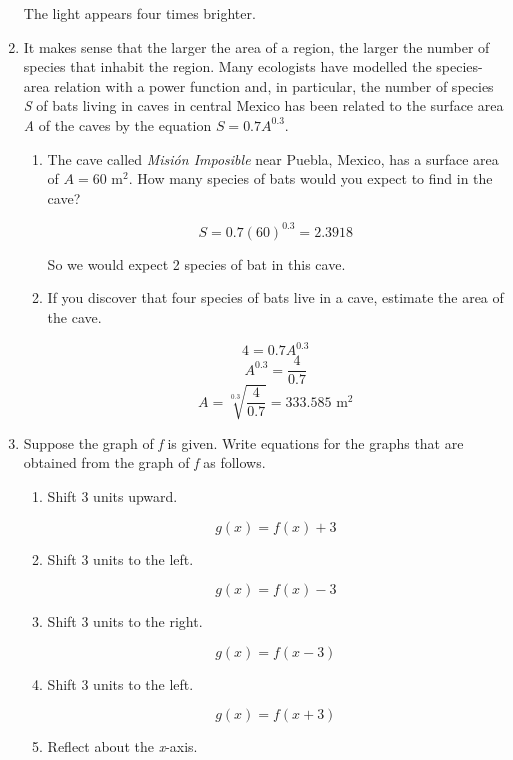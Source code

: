 \documentclass{article}
\begin{document}
\begin{enumerate}
			The light appears four times brighter.
			
		\item It makes sense that the larger the area of a region, the larger the number of species that inhabit the
			region. Many ecologists have modelled the species-area relation with a power function and, in particular,
			the number of species \emph{S} of bats living in caves in central Mexico has been related to the surface
			area \emph{A} of the caves by the equation $S = 0.7A^{0.3}$.

			\begin{enumerate}
				\item The cave called \emph{Misi\'{o}n Imposible} near Puebla, Mexico, has a surface area of
					$A = 60 \text{ m}^{2}$. How many species of bats would you expect to find in the cave?
					
					$$ S = 0.7(60)^{0.3} = 2.3918$$

					So we would expect 2 species of bat in this cave.

				\item If you discover that four species of bats live in a cave, estimate the area of the cave.

					$$4 = 0.7A^{0.3}$$
					$$A^{0.3} = \frac{4}{0.7}$$
					$$A = \sqrt[0.3]{\frac{4}{0.7}} = 333.585 \text{ m}^{2}$$
			\end{enumerate}

		\item Suppose the graph of \emph{f} is given. Write equations for the graphs that are obtained from the graph
			of \emph{f} as follows.

		\begin{enumerate}
			\item Shift 3 units upward.

				$$g(x) = f(x) + 3$$

			\item Shift 3 units to the left.
			
				$$g(x) = f(x) - 3$$

			\item Shift 3 units to the right.

				$$g(x) = f(x - 3)$$

			\item Shift 3 units to the left.
			
				$$g(x) = f(x + 3)$$
				
			\item Reflect about the \emph{x}-axis.
			

\end{enumerate}
\end{enumerate}
\end{document}
